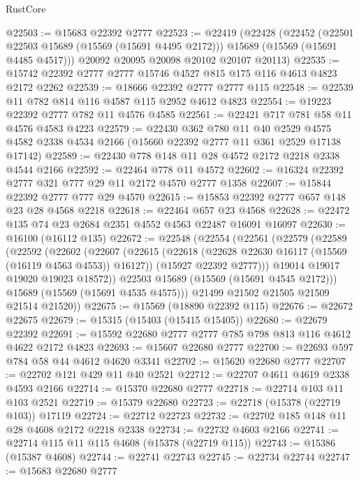 \begin{lexlean}{RustCore}
\begin{coremodule}
@22503 := @15683 @22392 @2777
@22523 := @22419
    (@22428
      (@22452
        (@22501 @22503 @15689 (@15569 (@15691 @4495 @2172)))
        @15689
        (@15569 (@15691 @4485 @4517)))
      @20092
      @20095
      @20098
      @20102
      @20107
      @20113)
@22535 := @15742 @22392 @2777 @2777 @15746 @4527 @815 @175 @116 @4613 @4823 @2172 @2262
@22539 := @18666 @22392 @2777 @2777 @115
@22548 := @22539 @11 @782 @814 @116 @4587 @115 @2952 @4612 @4823
@22554 := @19223 @22392 @2777 @782 @11 @4576 @4585
@22561 := @22421 @717 @781 @58 @11 @4576 @4583 @4223
@22579 := @22430
    @362
    @780
    @11
    @40
    @2529
    @4575
    @4582
    @2338
    @4534
    @2166
    (@15660 @22392 @2777 @11 @361 @2529 @17138 @17142)
@22589 := @22430 @778 @148 @11 @28 @4572 @2172 @2218 @2338 @4544 @2166
@22592 := @22464 @778 @11 @4572
@22602 := @16324 @22392 @2777 @321 @777 @29 @11 @2172 @4570 @2777 @1358
@22607 := @15844 @22392 @2777 @777 @29 @4570
@22615 := @15853 @22392 @2777 @657 @148 @23 @28 @4568 @2218
@22618 := @22464 @657 @23 @4568
@22628 := @22472 @135 @74 @23 @2684 @2351 @4552 @4563 @22487 @16091 @16097
@22630 := @16100 (@16112 @135)
@22672 := @22548
    (@22554
      (@22561
        (@22579
          (@22589
            (@22592
              (@22602
                (@22607
                  (@22615
                    (@22618 (@22628 @22630 @16117 (@15569 (@16119 @4563 @4553)) @16127))
                    (@15927 @22392 @2777)))
                @19014
                @19017
                @19020
                @19023
                @18572))
            @22503
            @15689
            (@15569 (@15691 @4545 @2172)))
          @15689
          (@15569 (@15691 @4535 @4575)))
        @21499
        @21502
        @21505
        @21509
        @21514
        @21520))
@22675 := @15569 (@18890 @22392 @115)
@22676 := @22672 @22675
@22679 := @15315 (@15403 (@15415 @15405))
@22680 := @22679 @22392
@22691 := @15592 @22680 @2777 @2777 @785 @798 @813 @116 @4612 @4622 @2172 @4823
@22693 := @15607 @22680 @2777
@22700 := @22693 @597 @784 @58 @44 @4612 @4620 @3341
@22702 := @15620 @22680 @2777
@22707 := @22702 @121 @429 @11 @40 @2521
@22712 := @22707 @4611 @4619 @2338 @4593 @2166
@22714 := @15370 @22680 @2777
@22718 := @22714 @103 @11 @103 @2521
@22719 := @15379 @22680
@22723 := @22718 (@15378 (@22719 @103)) @17119
@22724 := @22712 @22723
@22732 := @22702 @185 @148 @11 @28 @4608 @2172 @2218 @2338
@22734 := @22732 @4603 @2166
@22741 := @22714 @115 @11 @115 @4608 (@15378 (@22719 @115))
@22743 := @15386 (@15387 @4608)
@22744 := @22741 @22743
@22745 := @22734 @22744
@22747 := @15683 @22680 @2777

\end{coremodule}
\end{lexlean}
